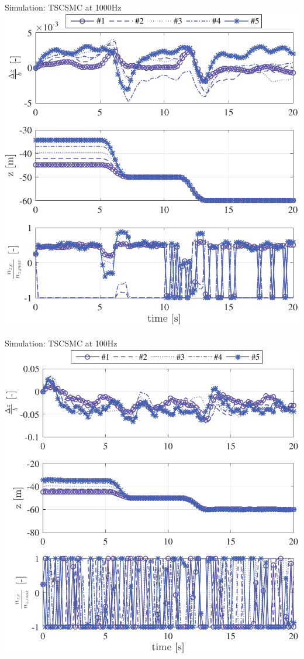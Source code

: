 \documentclass[12pt,svgnames,table,draft=false]{beamer}
\begin{document}
\begin{frame}{Simulation: TSCSMC \cite{galzi2006uav} at 1000Hz}
\centering
\includegraphics[height=.6\paperwidth]{TSCSMC-1000Hz-TIMESCALESEPARATION-turbulence=1}    %
\end{frame}

\begin{frame}{Simulation: TSCSMC at 100Hz}
\centering
\includegraphics[height=.6\paperwidth]{TSCSMC-100Hz-TIMESCALESEPARATION-turbulence=1}    %
\end{frame}
\end{document}
